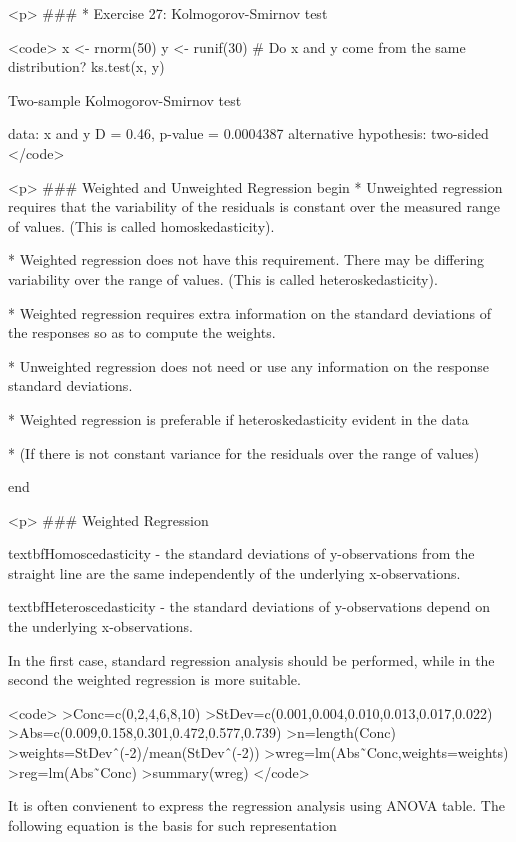 
<p>
###  *         {Exercise 27: Kolmogorov-Smirnov test}

<code>
x <- rnorm(50)
y <- runif(30)
# Do x and y come from the same distribution?
ks.test(x, y)

Two-sample Kolmogorov-Smirnov test

data:  x and y
D = 0.46, p-value = 0.0004387
alternative hypothesis: two-sided
</code>

<p>
### {Weighted and Unweighted Regression}
begin{ }
	 *           Unweighted regression requires that the variability of the
	residuals is constant over the measured range of values.
	(This is called homoskedasticity).
	
	 *           Weighted regression does not have this requirement.
	There may be differing variability over the range of values.
	(This is called heteroskedasticity).
	
	 *           Weighted regression requires extra information on the standard deviations of the responses so as to compute the weights.
	
	 *           Unweighted regression does not need or use any information on the response standard deviations.
	
	 *           Weighted regression is preferable if heteroskedasticity evident in the data
	
	 *           (If there is not constant variance for the residuals over the range of values)
	
end{ }


<p>
### {Weighted Regression}

textbf{Homoscedasticity} - the standard deviations of
y-observations from the straight line are the same independently
of the underlying x-observations.

textbf{Heteroscedasticity} - the standard deviations of
y-observations depend on the underlying x-observations.

In the first case, standard regression analysis should be
performed, while in the second the weighted regression is more
suitable.

<code>
>Conc=c(0,2,4,6,8,10)
>StDev=c(0.001,0.004,0.010,0.013,0.017,0.022)
>Abs=c(0.009,0.158,0.301,0.472,0.577,0.739)
>n=length(Conc)
>weights=StDevˆ(-2)/mean(StDevˆ(-2))
>wreg=lm(Abs˜Conc,weights=weights)
>reg=lm(Abs˜Conc)
>summary(wreg)
</code>


It is often convienent to express the regression analysis using
ANOVA table. The following equation is the basis for such
representation

